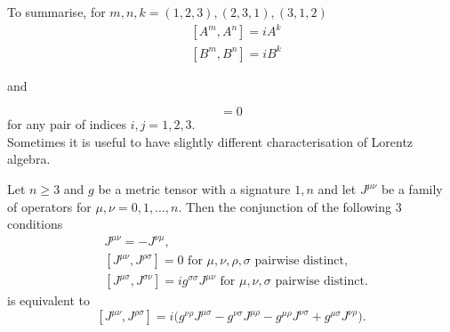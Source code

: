 \documentclass[main.tex]{subfiles}
\begin{document}
To summarise,
for $m, n, k = (1, 2, 3), (2, 3, 1), (3, 1, 2)$
\begin{align*}
& [A^m, A^n] = iA^k \\
& [B^m, B^n] = iB^k
\end{align*} 

and

\begin{equation}
[A^i, B^j] = 0
\end{equation}
for any pair of indices $i, j = 1, 2, 3$.\\

Sometimes it is useful to have slightly different characterisation of Lorentz algebra.

\begin{proposition}
\label{useful-char-of-lorentz-algebra}
Let $n\geq 3$ and $g$ be a metric tensor with a signature $1, n$ and let $J^{\mu\nu}$ be a family of operators for $\mu, \nu = 0, 1, \dots, n$. Then the conjunction of the following 3 conditions
\begin{align}
& J^{\mu\nu} = -J^{\nu\mu}, \nonumber \\
\label{3-conditions-for-lorentz-algebra}
& [J^{\mu\nu}, J^{\rho\sigma}] = 0 \text{ for } \mu, \nu, \rho, \sigma \text{ pairwise distinct},\\
& [J^{\mu\sigma}, J^{\sigma\nu}] = ig^{\sigma\sigma}J^{\mu\nu} \text{ for } \mu, \nu,  \sigma \text{ pairwise distinct}. \nonumber
\end{align}
is equivalent to 
\begin{equation}
\label{1-condition-for-lorentz-algebra}
[J^{\mu\nu}, J^{\rho\sigma}] = 
i\big( g^{\nu\rho } J^{\mu\sigma} 
- g^{\nu\sigma} J^{\mu\rho}
- g^{\mu\rho} J^{\nu\sigma}
+ g^{\mu\sigma} J^{\nu\rho}\big).
\end{equation}
\end{proposition}
\end{document}
